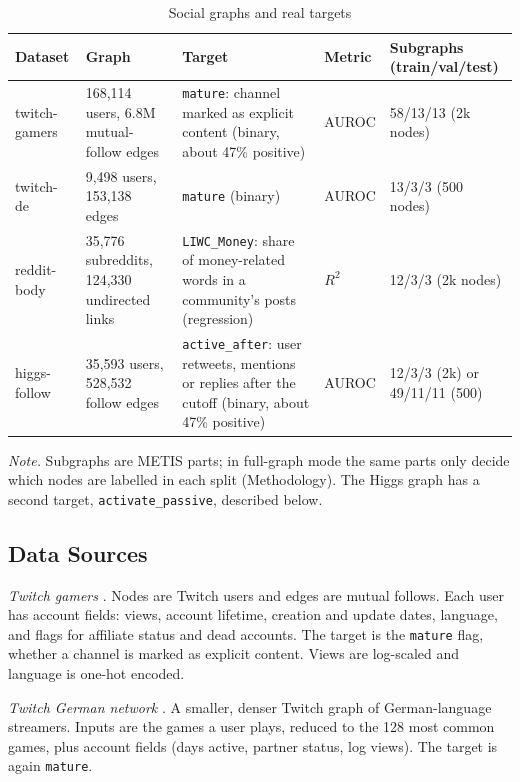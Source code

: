 \begin{table}[htbp]
\caption{Social graphs and real targets}
\label{tab:datasets}
\centering\small
\begin{tabular}{@{}L{1.0in}L{1.3in}L{2.0in}L{0.55in}L{0.85in}@{}}
\toprule
Dataset & Graph & Target & Metric & Subgraphs (train/val/test) \\
\midrule
twitch-gamers & 168,114 users, 6.8M mutual-follow edges & \texttt{mature}: channel marked as explicit content (binary, about 47\% positive) & AUROC & 58/13/13 (2k nodes) \\
twitch-de & 9,498 users, 153,138 edges & \texttt{mature} (binary) & AUROC & 13/3/3 (500 nodes) \\
reddit-body & 35,776 subreddits, 124,330 undirected links & \texttt{LIWC\_Money}: share of money-related words in a community's posts (regression) & $R^2$ & 12/3/3 (2k nodes) \\
higgs-follow & 35,593 users, 528,532 follow edges & \texttt{active\_after}: user retweets, mentions or replies after the cutoff (binary, about 47\% positive) & AUROC & 12/3/3 (2k) or 49/11/11 (500) \\
\bottomrule
\end{tabular}
\par\smallskip
\begin{minipage}{0.95\textwidth}\small
\textit{Note.} Subgraphs are METIS parts; in full-graph mode the same parts only decide which nodes are labelled in each split (Methodology). The Higgs graph has a second target, \texttt{activate\_passive}, described below.
\end{minipage}
\end{table}

\subsection{Data Sources}
\textit{Twitch gamers} \citep{f_rozemberczki2021b}. Nodes are Twitch users and edges are mutual follows. Each user has account fields: views, account lifetime, creation and update dates, language, and flags for affiliate status and dead accounts. The target is the \texttt{mature} flag, whether a channel is marked as explicit content. Views are log-scaled and language is one-hot encoded.

\textit{Twitch German network} \citep{f_rozemberczki2021}. A smaller, denser Twitch graph of German-language streamers. Inputs are the games a user plays, reduced to the 128 most common games, plus account fields (days active, partner status, log views). The target is again \texttt{mature}.

